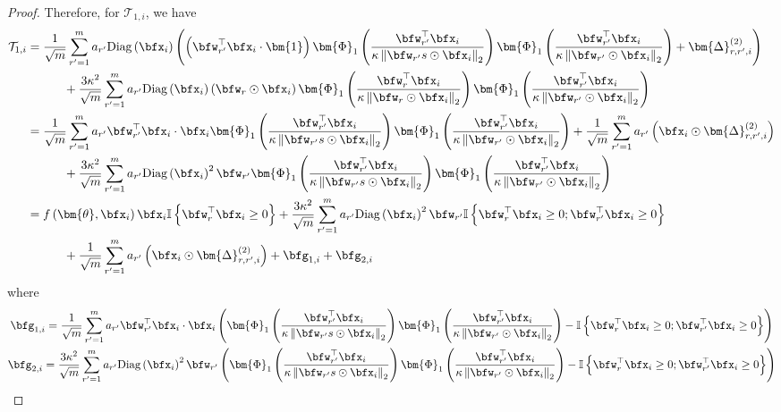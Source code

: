 \documentclass[10pt]{article} %
\theoremstyle{definition}
\theoremstyle{plain}
\newcommand{\paren}[1]{\left(#1\right)}
\newcommand{\norm}[1]{\left\|#1\right\|}
\newcommand{\indy}[1]{\mathbb{I}\left\{#1\right\}}
\begin{document}
\begin{proof}
    Therefore, for $\mathcal{T}_{1,i}$, we have
    \begin{align*}
        \mathcal{T}_{1,i} & = \frac{1}{\sqrt{m}}\sum_{r'=1}^ma_{r'}\text{Diag}\paren{\bfx_i}\paren{\paren{\bfw_{r'}^\top\bfx_i\cdot \bm{1}}\bm{\Phi}_1\paren{\frac{\bfw_{r'}^\top\bfx_i}{\kappa\norm{\bfw_{r'}s\odot\bfx_i}_2}}\bm{\Phi}_1\paren{\frac{\bfw_{r'}^\top\bfx_i}{\kappa\norm{\bfw_{r'}\odot\bfx_i}_2}} + \bm{\Delta}_{r,r',i}^{(2)}}\\
        & \quad\quad\quad + \frac{3\kappa^2}{\sqrt{m}}\sum_{r'=1}^ma_{r'}\text{Diag}\paren{\bfx_i}\paren{\bfw_r\odot\bfx_i}\bm{\Phi}_1\paren{\frac{\bfw_r^\top\bfx_i}{\kappa\norm{\bfw_r\odot\bfx_i}_2}}\bm{\Phi}_1\paren{\frac{\bfw_{r'}^\top\bfx_i}{\kappa\norm{\bfw_{r'}\odot\bfx_i}_2}}\\
        & = \frac{1}{\sqrt{m}}\sum_{r'=1}^ma_{r'}\bfw_{r'}^\top\bfx_i\cdot\bfx_i\bm{\Phi}_1\paren{\frac{\bfw_{r'}^\top\bfx_i}{\kappa\norm{\bfw_{r'}s\odot\bfx_i}_2}}\bm{\Phi}_1\paren{\frac{\bfw_{r'}^\top\bfx_i}{\kappa\norm{\bfw_{r'}\odot\bfx_i}_2}} + \frac{1}{\sqrt{m}}\sum_{r'=1}^ma_{r'}\paren{\bfx_i\odot \bm{\Delta}_{r,r',i}^{(2)}}\\
        &\quad\quad\quad + \frac{3\kappa^2}{\sqrt{m}}\sum_{r'=1}^ma_{r'}\text{Diag}\paren{\bfx_i}^2\bfw_{r'}\bm{\Phi}_1\paren{\frac{\bfw_{r'}^\top\bfx_i}{\kappa\norm{\bfw_{r'}s\odot\bfx_i}_2}}\bm{\Phi}_1\paren{\frac{\bfw_{r'}^\top\bfx_i}{\kappa\norm{\bfw_{r'}\odot\bfx_i}_2}}\\
        & = f\paren{\bm{\theta},\bfx_i}\bfx_i\indy{\bfw_{r}^\top\bfx_i\geq 0} + \frac{3\kappa^2}{\sqrt{m}}\sum_{r'=1}^ma_{r'}\text{Diag}\paren{\bfx_i}^2\bfw_{r'}\mathbb{I}\left\{\bfw_{r}^\top\bfx_i\geq 0;\bfw_{r'}^\top\bfx_i\geq 0\right\}\\
        & \quad\quad\quad + \frac{1}{\sqrt{m}}\sum_{r'=1}^ma_{r'}\paren{\bfx_i\odot \bm{\Delta}_{r,r',i}^{(2)}} + \bfg_{1,i} + \bfg_{2,i}\\
    \end{align*}
    where 
    \begin{gather*}
        \bfg_{1,i} = \frac{1}{\sqrt{m}}\sum_{r'=1}^ma_{r'}\bfw_{r'}^\top\bfx_i\cdot \bfx_i\paren{\bm{\Phi}_1\paren{\frac{\bfw_{r'}^\top\bfx_i}{\kappa\norm{\bfw_{r'}s\odot\bfx_i}_2}}\bm{\Phi}_1\paren{\frac{\bfw_{r'}^\top\bfx_i}{\kappa\norm{\bfw_{r'}\odot\bfx_i}_2}} - \indy{\bfw_r^\top\bfx_i\geq 0;\bfw_{r'}^\top\bfx_i\geq 0}}\\
        \bfg_{2,i} = \frac{3\kappa^2}{\sqrt{m}}\sum_{r'=1}^ma_{r'}\text{Diag}\paren{\bfx_i}^2\bfw_{r'}\paren{\bm{\Phi}_1\paren{\frac{\bfw_{r'}^\top\bfx_i}{\kappa\norm{\bfw_{r'}s\odot\bfx_i}_2}}\bm{\Phi}_1\paren{\frac{\bfw_{r'}^\top\bfx_i}{\kappa\norm{\bfw_{r'}\odot\bfx_i}_2}} - \indy{\bfw_r^\top\bfx_i\geq 0;\bfw_{r'}^\top\bfx_i\geq 0}}

\end{gather*}
\end{proof}
\end{document}
